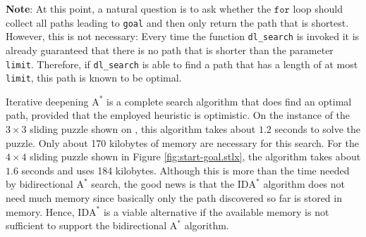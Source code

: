 \begin{enumerate}
      \textbf{Note}: At this point, a natural question is to ask whether the $\texttt{for}$ loop should collect
      all paths leading to \texttt{goal} and then only return the path that is shortest.  However, this is
      not necessary:  Every time the function \texttt{dl\_search} is invoked it is already guaranteed that there
      is no path that is shorter than the parameter \texttt{limit}.  Therefore, if \texttt{dl\_search} is able
      to find a path that has a length of at most \texttt{limit}, this path is known to be optimal.
\end{enumerate}
Iterative deepening $\mathrm{A}^*$ is a complete search algorithm that does find an optimal path, provided that the employed heuristic
is optimistic.  On the instance of the $3 \times 3$ sliding puzzle shown on , this
algorithm takes about $1.2$ seconds to solve the puzzle.  Only about 170 kilobytes of memory are necessary for
this search.  For the $4 \times 4$ sliding puzzle shown in Figure
\ref{fig:start-goal.stlx}, the algorithm 
takes about $1.6$ seconds and uses 184 kilobytes.  Although this is more than the time needed by bidirectional $\mathrm{A}^*$ search,
the good news is that the $\mathrm{IDA}^*$ algorithm does not need much memory since basically only the path
discovered so far is stored in memory.  Hence, $\mathrm{IDA}^*$ is a viable alternative if the available memory
is not sufficient to support the bidirectional $\mathrm{A}^*$ algorithm.



